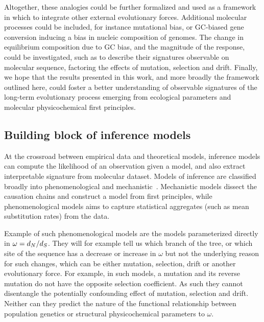 Altogether, these analogies could be further formalized and used as a framework in which to integrate other external evolutionary forces.
Additional molecular processes could be included, for instance mutational bias, or GC-biased gene conversion inducing a bias in nucleic composition of genomes.
The change in equilibrium composition due to GC bias, and the magnitude of the response, could be investigated, such as to describe their signatures observable on molecular sequence, factoring the effects of mutation, selection and drift.
Finally, we hope that the results presented in this work, and more broadly the framework outlined here, could foster a better understanding of observable signatures of the long-term evolutionary process emerging from ecological parameters and molecular physicochemical first principles.

\subsection{Building block of inference models}

At the crossroad between empirical data and theoretical models, inference models can compute the likelihood of an observation given a model, and also extract interpretable signature from molecular dataset.
Models of inference are classified broadly into phenomenological and mechanistic~\citep{Rodrigue2010a}.
Mechanistic models dissect the causation chains and construct a model from first principles, while phenomenological models aims to capture statistical aggregates (such as mean substitution rates) from the data.

Example of such phenomenological models are the models parameterized directly in $\omega = d_N / d_S$.
They will for example tell us which branch of the tree, or which site of the sequence has a decrease or increase in $\omega$ but not the underlying reason for such changes, which can be either mutation, selection, drift or another evolutionary force.
For example, in such models, a mutation and its reverse mutation do not have the opposite selection coefficient.
As such they cannot disentangle the potentially confounding effect of mutation, selection and drift.
Neither can they predict the nature of the functional relationship between population genetics or structural physicochemical parameters to $\omega$.

